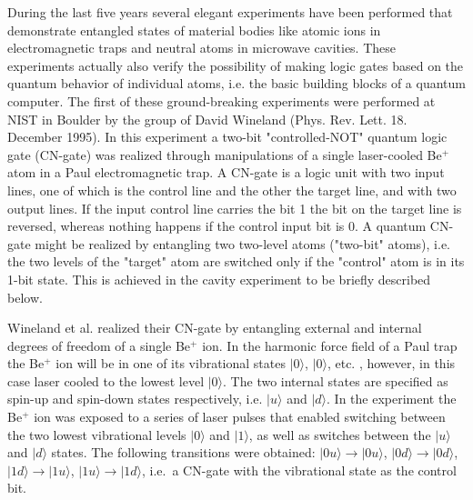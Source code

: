 During the last five years several elegant experiments have been
performed that demonstrate entangled states of material bodies like
atomic ions in electromagnetic traps and neutral atoms in microwave
cavities. These experiments actually also verify the possibility of
making logic gates based on the quantum behavior of individual atoms,
i.e. the basic building blocks of a quantum computer.  The first of
these ground-breaking experiments were performed at NIST in Boulder by
the group of David Wineland (Phys. Rev. Lett. 18. December 1995).  In
this experiment a two-bit "controlled-NOT" quantum logic gate
(CN-gate) was realized through manipulations of a single laser-cooled
Be$^+$ atom in a Paul electromagnetic trap.  A CN-gate is a logic unit
with two input lines, one of which is the control line and the other
the target line, and with two output lines. If the input control line
carries the bit 1 the bit on the target line is reversed, whereas
nothing happens if the control input bit is 0.  A quantum CN-gate
might be realized by entangling two two-level atoms ("two-bit" atoms),
i.e. the two levels of the "target" atom are switched only if the
"control" atom is in its 1-bit state.  This is achieved in the cavity
experiment to be briefly described below.

Wineland et al. realized their CN-gate by entangling external and
internal degrees of freedom of a single Be$^+$ ion.  In the harmonic
force field of a Paul trap the Be$^+$ ion will be in one of its
vibrational states $|0\rangle$, $|0\rangle$, etc. , however, in this
case laser cooled to the lowest level $|0\rangle$.  The two internal
states are specified as spin-up and spin-down states respectively,
i.e. $|u\rangle$ and $|d\rangle$.  In the experiment the Be$^+$ ion was
exposed to a series of laser pulses that enabled switching between the
two lowest vibrational levels $|0\rangle$ and $|1\rangle$, as well as
switches between the $|u\rangle$ and $|d\rangle$ states.  The
following transitions were obtained: $|0u\rangle\rightarrow
|0u\rangle$, $|0d\rangle\rightarrow |0d\rangle$,
$|1d\rangle\rightarrow |1u\rangle$, $|1u\rangle\rightarrow
|1d\rangle$, i.e.~a CN-gate with the vibrational state as the control
bit.

